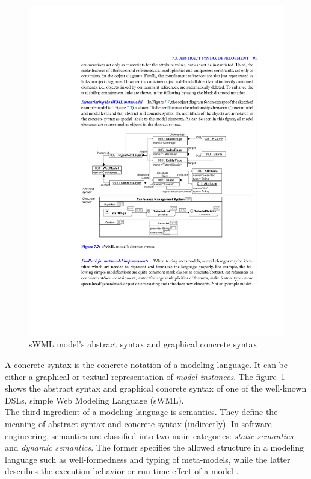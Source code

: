 \begin{figure}[H]
\centering
\captionsetup{justification=centering}
\vspace{0cm}%
\includegraphics[width=0.75\linewidth]{figure/literatures/brambilla_abstract_concrete.pdf}
\caption{sWML model's abstract syntax and graphical concrete syntax \cite{Brambilla}}
\label{fig:brambilla-abstract-concrete}
\end{figure}

A concrete syntax is the concrete notation of a modeling language. It can be either a graphical or textual representation of \textit{model instances}. The figure~\ref{fig:brambilla-abstract-concrete} shows the abstract syntax and graphical concrete syntax of one of the well-known DSLs, simple Web Modeling Language (sWML). \\

The third ingredient of a modeling language is semantics. They define the meaning of abstract syntax and concrete syntax (indirectly). In software engineering, semantics are classified into two main categories: \textit{static semantics} and \textit{dynamic semantics}. The former specifies the allowed structure in a modeling language such as well-formedness and typing of meta-models, while the latter describes the execution behavior or run-time effect of a model \cite{Stuurman}.\\

